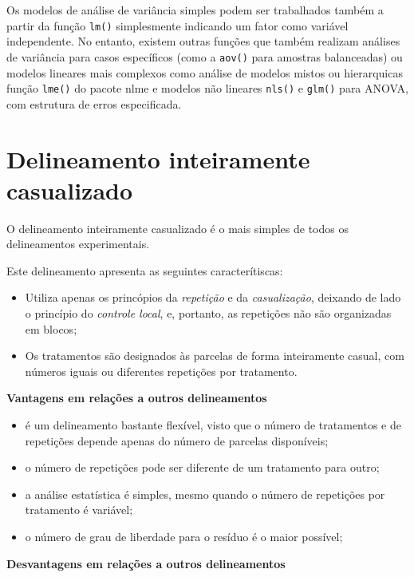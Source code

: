 \documentclass[
]{book}
\providecommand{\tightlist}{%
  \setlength{\itemsep}{0pt}\setlength{\parskip}{0pt}}
\begin{document}
Os modelos de análise de variância simples podem ser trabalhados também a partir da função \texttt{lm()} simplesmente indicando um fator como variável independente. No entanto, existem outras funções que também realizam análises de variância para casos específicos (como a \texttt{aov()} para amostras balanceadas) ou modelos lineares mais complexos como análise de modelos mistos ou hierarquicas função \texttt{lme()} do pacote nlme e modelos não lineares \texttt{nls()} e \texttt{glm()} para ANOVA, com estrutura de erros especificada.

\hypertarget{delineamento-inteiramente-casualizado}{%
\section{Delineamento inteiramente casualizado}\label{delineamento-inteiramente-casualizado}}

O delineamento inteiramente casualizado é o mais simples de todos os delineamentos experimentais.

Este delineamento apresenta as seguintes caracterítiscas:

\begin{itemize}
\item
  Utiliza apenas os princópios da \emph{repetição} e da \emph{casualização}, deixando de lado o princípio do \emph{controle local}, e, portanto, as repetições não são organizadas em blocos;
\item
  Os tratamentos são designados às parcelas de forma inteiramente casual, com números iguais ou diferentes repetições por tratamento.
\end{itemize}

\textbf{Vantagens em relações a outros delineamentos}

\begin{itemize}
\tightlist
\item
  é um delineamento bastante flexível, visto que o número de tratamentos e de repetições depende apenas do número de parcelas disponíveis;
\item
  o número de repetições pode ser diferente de um tratamento para outro;
\item
  a análise estatística é simples, mesmo quando o número de repetições por tratamento é variável;
\item
  o número de grau de liberdade para o resíduo é o maior possível;
\end{itemize}

\textbf{Desvantagens em relações a outros delineamentos}
\end{document}
